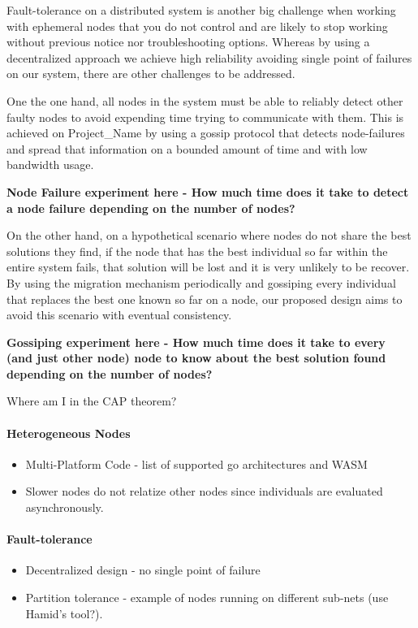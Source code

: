 Fault-tolerance on a distributed system is another big challenge when working with ephemeral nodes that you do not control and are likely to stop working without previous notice nor troubleshooting options. Whereas by using a decentralized approach we achieve high reliability avoiding single point of failures on our system, there are other challenges to be addressed.

One the one hand, all nodes in the system must be able to reliably detect other faulty nodes to avoid expending time trying to communicate with them. This is achieved on Project\_Name by using a gossip protocol that detects node-failures and spread that information on a bounded amount of time and with low bandwidth usage.

\textbf{Node Failure experiment here - How much time does it take to detect a node failure depending on the number of nodes?}

On the other hand, on a hypothetical scenario where nodes do not share the best solutions they find, if the node that has the best individual so far within the entire system fails, that solution will be lost and it is very unlikely to be recover. By using the migration mechanism periodically and gossiping every individual that replaces the best one known so far on a node, our proposed design aims to avoid this scenario with eventual consistency.

\textbf{Gossiping experiment here - How much time does it take to every (and just other node) node to know about the best solution found depending on the number of nodes?}




Where am I in the CAP theorem?

\paragraph*{Heterogeneous Nodes}
\begin{itemize}
	\item Multi-Platform Code - list of supported go architectures and WASM
	\item Slower nodes do not relatize other nodes since individuals are evaluated asynchronously.
\end{itemize}

\paragraph*{Fault-tolerance}
\begin{itemize}
	\item Decentralized design - no single point of failure
	\item Partition tolerance - example of nodes running on different sub-nets (use Hamid's tool?).
\end{itemize}

